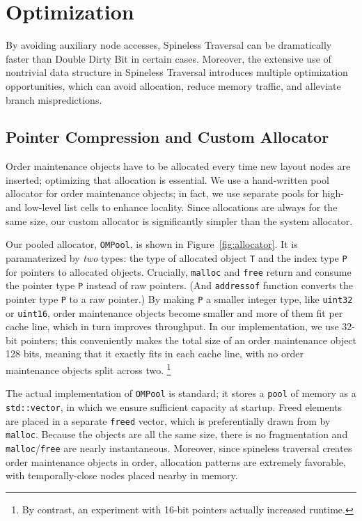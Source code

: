 \section{Optimization}
\label{sec:opt}

By avoiding auxiliary node accesses,
  Spineless Traversal can be
  dramatically faster than Double Dirty Bit
  in certain cases.
Moreover, the extensive use of nontrivial data structure in Spineless Traversal
  introduces multiple optimization opportunities, which can avoid allocation, reduce memory traffic, and alleviate branch mispredictions.

\subsection{Pointer Compression and Custom Allocator}
Order maintenance objects have to be allocated every time
  new layout nodes are inserted;
  optimizing that allocation is essential.
We use a hand-written pool allocator for order maintenance objects;
  in fact, we use separate pools
  for high- and low-level list cells
  to enhance locality.
Since allocations are always for the same size,
  our custom allocator is significantly simpler than the system allocator.

Our pooled allocator, \texttt{OMPool},
  is shown in Figure~\ref{fig:allocator}.
It is paramaterized by \emph{two} types:
  the type of allocated object \texttt{T}
  and the index type \texttt{P} for pointers to allocated objects.
Crucially,
  \texttt{malloc} and \texttt{free} return and consume
  the pointer type \texttt{P} instead of raw pointers.
(And \texttt{addressof} function converts
  the pointer type \texttt{P} to a raw pointer.)
By making \texttt{P} a smaller integer type,
  like \texttt{uint32} or \texttt{uint16},
  order maintenance objects become smaller
  and more of them fit per cache line,
  which in turn improves throughput.
In our implementation, we use 32-bit pointers;
  this conveniently makes the total size
  of an order maintenance object 128 bits,
  meaning that it exactly fits in each cache line,
  with no order maintenance objects split across two.
\footnote{By contrast, an experiment with 16-bit pointers
  actually increased runtime.}

The actual implementation of \texttt{OMPool} is standard;
  it stores a \texttt{pool} of memory as a \texttt{std::vector},
  in which we ensure sufficient capacity at startup.
Freed elements are placed in a separate \texttt{freed} vector,
  which is preferentially drawn from by \texttt{malloc}.
Because the objects are all the same size,
  there is no fragmentation and \texttt{malloc}/\texttt{free}
  are nearly instantaneous.
Moreover, since spineless traversal
  creates order maintenance objects in order,
  allocation patterns are extremely favorable,
  with temporally-close nodes placed nearby in memory.

